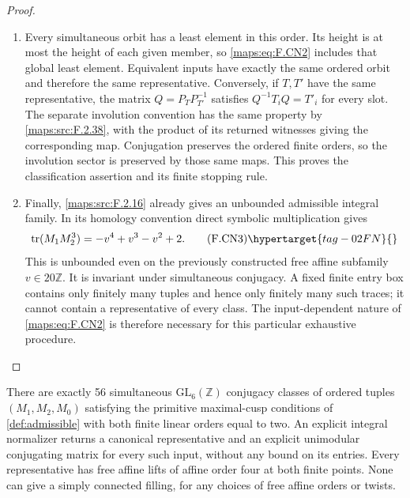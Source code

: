 \begin{proof}
\begin{enumerate}[label={$\langle1\rangle$\arabic*.}]
\item Every simultaneous orbit has a least element in this order.
Its height is at most the height of each given member, so
\eqref{maps:eq:F.CN2} includes that global least element.
Equivalent inputs have exactly the same ordered orbit and
therefore the same representative. Conversely, if $T,T'$ have
the same representative, the matrix
$Q=P_TP_{T'}^{-1}$ satisfies $Q^{-1}T_iQ=T'_i$ for every slot.
The separate involution convention has the same property by
\cref{maps:src:F.2.38}, with the product of its returned
witnesses giving the corresponding map. Conjugation preserves
the ordered finite orders, so the involution sector is preserved
by those same maps. This proves the classification assertion
and its finite stopping rule.

\item Finally, \ref{maps:src:F.2.16} already gives an unbounded admissible integral
family. In its homology convention direct symbolic
multiplication gives
\[
             \operatorname{tr}(M_1M_2^3)
                       =-v^4+v^3-v^2+2.                 \tag{F.CN3}\hypertarget{tag-02FN}{}\label{maps:eq:F.CN3}
\]
This is unbounded even on the previously constructed free
affine subfamily $v\in20\mathbb Z$. It is invariant under
simultaneous conjugacy. A fixed finite entry box contains
only finitely many tuples and hence only finitely many such
traces; it cannot contain a representative of every class.
The input-dependent nature of \eqref{maps:eq:F.CN2} is therefore necessary
for this particular exhaustive procedure.

\end{enumerate}
\end{proof}




\begin{theorem}\hypertarget{tag-02NT}{}\label{maps:src:F.2.38}


There are exactly 56 simultaneous $\mathrm{GL}_6(\mathbb Z)$
conjugacy classes of ordered tuples $(M_1,M_2,M_0)$ satisfying
the primitive maximal-cusp conditions of \cref{def:admissible} with both finite linear orders equal to two.  An explicit integral normalizer
returns a canonical representative and an explicit unimodular
conjugating matrix for every such input, without any bound on
its entries.  Every representative has free affine lifts of
affine order four at both finite points.  None can give a
simply connected filling, for any choices of free affine
orders or twists.

\end{theorem}


